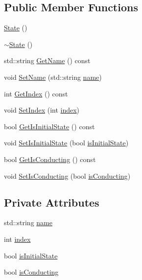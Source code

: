 \subsection*{Public Member Functions}
\begin{DoxyCompactItemize}
\item 
\hyperlink{classState_ab91bb1dd5aa6260ab2a456581daf9ec2}{State} ()
\item 
\hyperlink{classState_afab438d92b90dc18d194dbd9c9c8bab3}{$\sim$State} ()
\item 
std::string \hyperlink{classState_a53d7c7ca3f4bbd4ed057d34bfffbaab3}{GetName} () const 
\item 
void \hyperlink{classState_a0aa838bac877e885a40846b40f7fb3f7}{SetName} (std::string \hyperlink{classState_ad57f19fd0a86f129840d8739253d2c72}{name})
\item 
int \hyperlink{classState_a0df5da1bbb6f418694ce5f789ca7e6c5}{GetIndex} () const 
\item 
void \hyperlink{classState_a0a366542e4e8f21aed25152ee7cea6be}{SetIndex} (int \hyperlink{classState_a91451f2d71245fba7cfe1d2ff248c13c}{index})
\item 
bool \hyperlink{classState_ad70ea5b882eb85376b91acd0fd89ad0f}{GetIsInitialState} () const 
\item 
void \hyperlink{classState_a3d6b9ceac51f4c063628ba5708db926a}{SetIsInitialState} (bool \hyperlink{classState_a3f648ae24fee45cce26ce51bbe93deb4}{isInitialState})
\item 
bool \hyperlink{classState_a25100298e536317fd0f6d53220a017a7}{GetIsConducting} () const 
\item 
void \hyperlink{classState_aba42323ab4cf1fe314181fcdd3273acf}{SetIsConducting} (bool \hyperlink{classState_a5d20171d44b393ae9bad5cd61d1e8f45}{isConducting})
\end{DoxyCompactItemize}
\subsection*{Private Attributes}
\begin{DoxyCompactItemize}
\item 
std::string \hyperlink{classState_ad57f19fd0a86f129840d8739253d2c72}{name}
\item 
int \hyperlink{classState_a91451f2d71245fba7cfe1d2ff248c13c}{index}
\item 
bool \hyperlink{classState_a3f648ae24fee45cce26ce51bbe93deb4}{isInitialState}
\item 
bool \hyperlink{classState_a5d20171d44b393ae9bad5cd61d1e8f45}{isConducting}
\end{DoxyCompactItemize}


